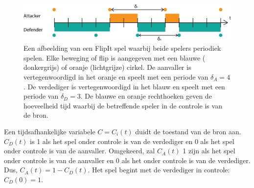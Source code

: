 \documentclass[master=cws, masteroption=vs,english]{kulemt}
\begin{document}
\begin{abstract*}
\begin{figure}[hbtp]
\center
\includegraphics[scale=0.7]{../../doc/template/Images/DefFlipit}
\caption{Een afbeelding van een FlipIt spel waarbij beide spelers periodiek spelen. Elke beweging of flip is aangegeven met een blauwe ( donkergrijs) of oranje (lichtgrijze) cirkel. De aanvaller is vertegenwoordigd in het oranje en speelt met een periode van $ \delta_{A} = 4 $. De verdediger is vertegenwoordigd in het blauw en speelt met een periode van $ \delta_{D} = 3 $. De blauwe en oranje rechthoeken geven de hoeveelheid tijd waarbij de betreffende speler in de controle is van de bron.}
\label{fig: FLipItDefault}
\end{figure}



Een tijdsafhankelijke variabele $ C = C_{i}(t) $ duidt de toestand van de bron aan.
$ C_{D}(t) $ is 1 als het spel onder controle is van de verdediger en 0 als het spel onder controle is van de aanvaller. Omgekeerd, zal $ C_{A}(t) $ 1 zijn als het spel onder controle is van de aanvaller en 0 als het onder controle is van de verdediger. Dus, $ C_{A}(t) = 1 - C_{D}(t) $.
Het spel begint met de verdediger in controle: $ C_{D}(0) = 1 $. \\



\end{abstract*}
\end{document}
